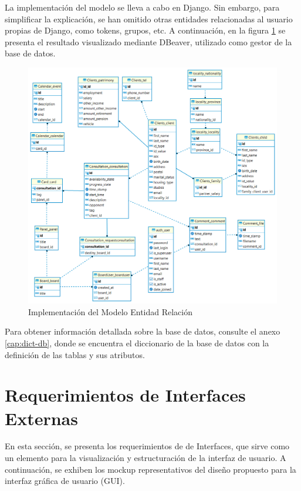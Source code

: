 \newpage

La implementación del modelo se lleva a cabo en Django. Sin embargo, para simplificar la explicación, se han omitido otras entidades relacionadas al usuario propias de Django, como tokens, grupos, etc. A continuación, en la  figura \ref{fig:dbeaver} se presenta el resultado visualizado mediante DBeaver, utilizado como gestor de la base de datos.

\begin{figure}[H]
    \centering
    \includegraphics[width=1\linewidth]{fig/dbeaver.png}
    \caption{Implementación del Modelo Entidad Relación}
    \label{fig:dbeaver}
\end{figure}


Para obtener información detallada sobre la base de datos, consulte el anexo \ref{cap:dict-db}, donde se encuentra el diccionario de la base de datos con la definición de las tablas y sus atributos.


\section{Requerimientos de Interfaces Externas}


En esta sección, se presenta los requerimientos de de Interfaces, que sirve como un elemento para la visualización y estructuración de la interfaz de usuario. A continuación, se exhiben los mockup representativos del diseño propuesto para la interfaz gráfica de usuario (GUI).

